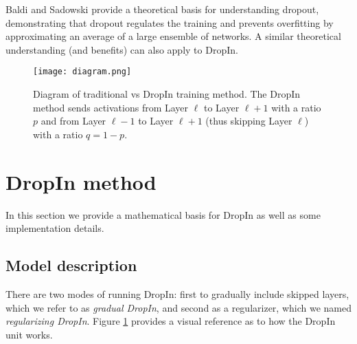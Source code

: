 \documentclass[10pt,twocolumn,letterpaper]{article}
\newcommand{\dropin}{DropIn }
\newcommand{\dropinNS}{DropIn}
\begin{document}
Baldi and Sadowski \cite{baldi2013understanding} provide a theoretical basis for understanding dropout,  demonstrating that dropout regulates the training and prevents overfitting by approximating an average of a  large ensemble of networks.  
A similar theoretical understanding (and benefits) can also apply to \dropinNS.



\begin{figure}[tb]
\begin{center}
   \texttt{[image: diagram.png]}
\end{center}
  \vspace{-10pt}
   \caption{Diagram of traditional vs \dropin training method.  The \dropin method sends activations from Layer $ {\ell} $ to Layer $ {\ell+1} $ with a ratio $p$ and from Layer $ {\ell-1} $ to Layer $ {\ell+1}$ (thus skipping Layer $\ell$) with a ratio $q=1-p$.
}
\label{fig:diagram}
  \vspace{-10pt}
\end{figure}


\section{\dropin method}
In this section we provide a mathematical basis for \dropin as well as some implementation details.

\subsection{Model description}
\label{sec:model}
There are two modes of running \dropinNS: first to gradually include skipped layers, which we refer to as \textit{gradual \dropinNS}, and second as a regularizer, which we named \textit{regularizing \dropinNS}.
Figure \ref{fig:diagram} provides a visual reference as to how the \dropin unit works.
\end{document}
